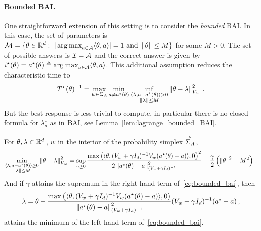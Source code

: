 \paragraph{Bounded BAI.}\label{sec:lgc.formulation.examples.bounded}
One straightforward extension of this setting is to consider the \emph{bounded} BAI. In this case, the set of parameters is $\mathcal{M}=\{\theta \in \mathbb{R}^d:\ |\operatorname*{arg\,max}_{a\in\mathcal{A}} \langle\theta,a\rangle|=1 \text{ and } \left\lVert\theta\right\rVert\leq M\}$ for some $M>0$. The set of possible answers is $\mathcal{I} = \mathcal{A}$ and the correct answer is given by $i^\star(\theta)=a^\star(\theta)\triangleq \operatorname*{arg\,max}_{a\in\mathcal{A}} \langle\theta,a\rangle$.
This additional assumption reduces the characteristic time to
\[
T^{\star}(\theta)^{-1} = \max_{w\in\Sigma_A} \min_{a\neq a^\star(\theta)} \inf_{\substack{\langle \lambda,a-a^\star(\theta)\rangle>0\\ \left\lVert\lambda\right\rVert\leq M}} \left\lVert\theta -\lambda \right\rVert_{V_w}^2 \,.
\]
But the best response is less trivial to compute, in particular there is no closed formula for $\lambda^\star_a$ as in BAI, see Lemma~\ref{lem:lagrange_bounded_BAI}.
\begin{lemma}
  \label{lem:lagrange_bounded_BAI}
For $\theta, \lambda \in \mathbb{R}^d\,$, $w$ in the interior of the probability simplex $\overset{\circ}{\Sigma_A}$,
\begin{align}\label{eq:bounded_bai}
\min_{\substack{\langle \lambda,a-a^\star(\theta)\rangle\geq 0\\ \left\lVert\lambda\right\rVert\leq M}} \left\lVert\theta -\lambda \right\rVert_{V_w}^2 = \sup_{\gamma\geq 0} \frac{\max\left(\langle \theta, (V_w+\gamma I_d)^{-1} V_w (a^\star(\theta)-a)\rangle,0\right)^2 }{2\left\lVert a^\star(\theta)-a\right\rVert^2_{(V_w+\gamma I_d)^{-1}}}- \frac{\gamma}{2}\left(\left\lVert\theta\right\rVert^2-M^2\right)\,.
\end{align}
And if $\gamma$ attains the supremum in the right hand term of~\eqref{eq:bounded_bai}, then
\[
\lambda = \theta - \frac{\max\left(\langle \theta, (V_w+\gamma I_d)^{-1} V_w (a^\star(\theta)-a)\rangle,0\right)}{\left\lVert a^\star(\theta)-a\right\rVert^2_{(V_w+\gamma I_d)^{-1}}} (V_w+\gamma I_d)^{-1}(a^\star - a)\,,
\]
attains the minimum of the left hand term of~\eqref{eq:bounded_bai}.
\end{lemma}
